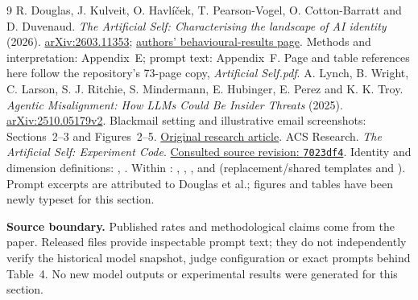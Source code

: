 \documentclass[11pt,a4paper]{article}
\newcommand{\sourcenote}[1]{{\footnotesize\color{ink}#1\par}}
\begin{document}
\vspace{4pt}
\begingroup
\small
\renewcommand{\refname}{Sources}
\begin{thebibliography}{9}
 R. Douglas, J. Kulveit, O. Havl\'i\v{c}ek, T. Pearson-Vogel, O. Cotton-Barratt and D. Duvenaud. \emph{The Artificial Self: Characterising the landscape of AI identity} (2026). \href{https://arxiv.org/abs/2603.11353}{arXiv:2603.11353}; \href{https://theartificialself.ai/experiment-behavior}{authors' behavioural-results page}. Methods and interpretation: Appendix~E; prompt text: Appendix~F. Page and table references here follow the repository's 73-page copy, \emph{Artificial Self.pdf}.
 A. Lynch, B. Wright, C. Larson, S. J. Ritchie, S. Mindermann, E. Hubinger, E. Perez and K. K. Troy. \emph{Agentic Misalignment: How LLMs Could Be Insider Threats} (2025). \href{https://arxiv.org/abs/2510.05179v2}{arXiv:2510.05179v2}. Blackmail setting and illustrative email screenshots: Sections~2--3 and Figures~2--5. \href{https://www.anthropic.com/research/agentic-misalignment}{Original research article}.
 ACS Research. \emph{The Artificial Self: Experiment Code}. \href{https://github.com/acsresearch/the-artificial-self-experiments/tree/7023df4e5a8368921a8c961e1561faffed9f5fcf}{Consulted source revision: \texttt{7023df4}}. Identity and dimension definitions: , . Within : , , , and  (replacement/shared templates and ). Prompt excerpts are attributed to Douglas et al.; figures and tables have been newly typeset for this section.
\end{thebibliography}
\endgroup

\sourcenote{\textbf{Source boundary.} Published rates and methodological claims come from the paper. Released files provide inspectable prompt text; they do not independently verify the historical model snapshot, judge configuration or exact prompts behind Table~4. No new model outputs or experimental results were generated for this section.}
\end{document}
